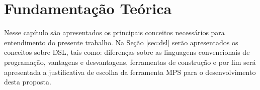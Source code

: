 \chapter{Fundamentação Teórica}
\label{chap:fundamentacao}

Nesse capítulo são apresentados os principais conceitos necessários para entendimento do presente trabalho. Na Seção \ref{sec:dsl} serão apresentados os conceitos sobre \gls{DSL}, tais como: diferenças sobre as linguagens convencionais de programação, vantagens e desvantagens, ferramentas de construção e por fim será apresentada a justificativa de escolha da ferramenta \gls{MPS} para o desenvolvimento desta proposta.




